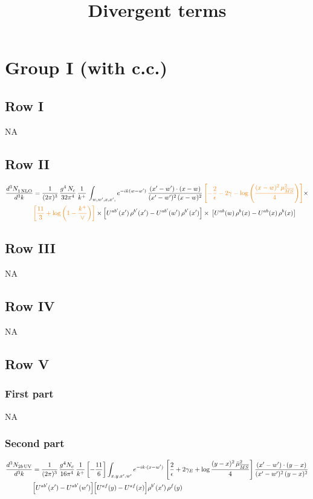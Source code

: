 \documentclass[9pt]{article}
\title{Divergent terms}
\author{}
\date{}
\numberwithin{equation}{section}
\begin{document}
\maketitle 
\section{Group I (with c.c.)}
\subsection{Row I}
\textsc{NA}
\subsection{Row II}
\begin{align}
     \frac{d^{3}N_{1\,\rm NLO}^{\rm}}{d^{3}k} &  =  \frac{1}{(2\pi)^{3}}\, \frac{g^{4}\,N_{c}}{32\pi^{4}}\,\frac{1}{k^{+}}\, \int_{w, w',x,x',} e^{-ik(w-w^\prime)}\, \frac{(x'-w')\cdot (x-w)}{(x'-w')^{2}\, (x-w)^{2}}\, {\color{orange}\left[-\frac{2}{\epsilon}-2\gamma-\log{\left(\frac{(x-w)^{2}\,\mu^{2}_{\overline{MS}}}{4}\right)}\right]}\times \notag \\ & {\color{orange}\left[\frac{11}{3}+\log{\left(1-\frac{k^{+}}{\vee}\right)}\right]}\times \left[U^{ab'}(x')\,\rho^{b'}(x') - U^{ab'}(w')\,\rho^{b'}(x')\right]\times\,\left[U^{ab}(w)\,\rho^{b}(x) - U^{ab}(x)\,\rho^{b}(x)\right]
\end{align}
\subsection{Row III}
\textsc{NA}
\subsection{Row IV}
\textsc{NA}
\subsection{Row V}
\subsubsection*{First part}
\textsc{NA}
\subsubsection*{Second part}
\begin{align}
\frac{d^{3}N_{2b\,\rm UV}}{d^{3}k}&=\frac{1}{(2\pi)^{3}}\,\frac{g^{4}N_{c}}{16\pi^{4}}\,\frac{1}{k^{+}}\left[-\frac{11}{6}\right]\int_{x,y,x',w'}e^{-ik\cdot(x-w')}\,\left[\frac{2}{\epsilon}+2\gamma_{E}+\log\frac{(y-x)^{2}\,\bar\mu^{2}_{\overline{MS}}}{4}\right]\frac{(x'-w')\cdot(y-x)}{(x'-w')^{2}\,(y-x)^{2}}\notag \\ & \Big[U^{ab'}(x')-U^{ab'}(w')\Big]\Big[U^{af}(y)-U^{af}(x)\Big]\rho^{b'}(x')\,\rho^{f}(y)
\end{align}
\end{document}
